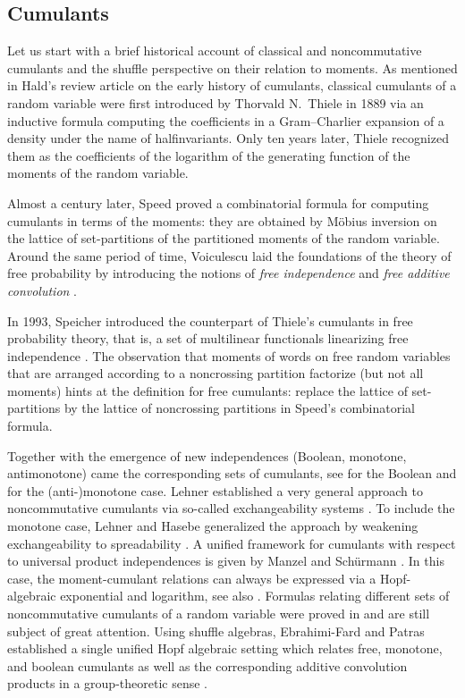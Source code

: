 \documentclass[pdftex]{sigma}
\numberwithin{equation}{section}
\begin{document}
\subsection{Cumulants}
\label{sec:cumulants}

Let us start with a brief historical account of classical and noncommutative cumulants and the shuffle perspective on their relation to moments. As mentioned in Hald's review article \cite{hald2000cumulants} on the early history of cumulants,
classical cumulants of a random variable were first introduced by Thorvald N.~Thiele in 1889 via an inductive formula computing the coefficients in a Gram--Charlier expansion of a density under the name of halfinvariants. Only ten years later, Thiele recognized them as the coefficients of the logarithm of the generating function of the moments of the random variable.

Almost a century later, Speed \cite{speed1983cumulants} proved a combinatorial formula for computing cumulants in terms of the moments: they are obtained by M\"obius inversion on the lattice of set-partitions of the partitioned moments of the random variable.
Around the same period of time, Voiculescu laid the foundations of the theory of free probability by introducing the notions of \emph{free independence} and \emph{free additive convolution} \cite{Voiculescu1985symmetries,Voiculescu1986addition}.

In 1993, Speicher introduced the counterpart of Thiele's cumulants in free probability theory, that is, a set of multilinear functionals linearizing free independence \cite{Speicher1994freecumulants}. The observation that moments of words on free random variables that are arranged according to a noncrossing partition
factorize (but not all moments) hints at the definition for free cumulants: replace the lattice of set-partitions by the lattice of noncrossing partitions in Speed's combinatorial formula.

Together with the emergence of new independences (Boolean, monotone, antimonotone) came the corresponding sets of cumulants, see \cite{SpeicherWoroudi1997bool} for the Boolean and \cite{HasebeSaigo2011monotone} for the {(anti\nobreakdash-)}monotone case. Lehner established a very general approach to noncommutative cumulants via so-called exchangeability systems \cite{Lehner2004exchange}. To include the monotone case, Lehner and Hasebe generalized the approach by weakening exchangeability to spreadability \cite{HasebeLehner2017p}.
A unified framework for cumulants with respect to universal product independences is given by Manzel and Sch\"urmann \cite{ManzelSchurmann17}. In this case, the moment-cumulant relations can always be expressed via a Hopf-algebraic exponential and logarithm, see also \cite{Gerhold21p}.
Formulas relating different sets of noncommutative cumulants of a random variable were proved in \cite{ArizmendiHasebeLehnerVargas2015cumulants} and are still subject of great attention. Using shuffle algebras, Ebrahimi-Fard and Patras established a single unified Hopf algebraic setting which relates free, monotone, and boolean cumulants \cite{ebrahimi2015cumulants} as well as the corresponding additive convolution products in a group-theoretic sense \cite{EbrahimiFardPatras2019applications}.
\end{document}
